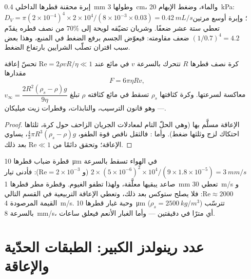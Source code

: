 \begin{example}\label{ex:b2:viscous-flows:fourth}
إبرة محقنة قطرها الداخلي \qty{0.4}{mm} وطولها \qty{3}{cm}،
والماء، وضغط الإبهام \qty{20}{kPa}: $D_V = \pi(2 \times 10^{-4})^4 \times 2 \times
10^4/(8 \times 10^{-3} \times 0.03) = \qty{0.42}{mL/s}$؛ وإبرة أوسع مرتين
تعطي ستة عشر ضعفًا. وشريان تضيّقه لويحة إلى $70\%$ من نصف
قطره يقدّم $(1/0.7)^4 = 4.2$ ضعف مقاومته: فيعوّض الجسم
برفع الضغط في المنبع، وهذا بعض سبب اقتران تصلّب الشرايين
بارتفاع الضغط.
\end{example}

\begin{proposition}\label{prop:b2:viscous-flows:stokes}
كرة نصف قطرها $R$ تتحرك بالسرعة $v$ في مائع عند
$\mathrm{Re} = 2\rho vR/\eta \ll 1$ تحسّ إعاقة مقدارها
\[
F = 6\pi\eta Rv ,
\]
معاكسة لسرعتها. وكرة كثافتها $\rho_s$ تسقط في مائع
كثافته $\rho$ تبلغ \emph{} $v_\infty =
\dfrac{2R^2(\rho_s - \rho)g}{9\eta}$ --- وهو قانون الترسيب،
والنابذات، وقطرات زيت ميليكان.
\end{proposition}

\begin{proof}
الإعاقة مسلَّم بها (وهي الحلّ التام لمعادلات الجريان الزاحف
حول كرة، ثلثاها احتكاك لزج وثلثها ضغط). وأما : فالثقل ناقص قوة الطفو، $\tfrac43\pi R^3(\rho_s -
\rho)g$، يساوي الإعاقة؛ وتحقق دائمًا من $\mathrm{Re} \ll 1$ بعد ذلك.
\end{proof}

\begin{example}\label{ex:b2:viscous-flows:fog}
قطرة ضباب قطرها \qty{10}{\micro m} في الهواء تسقط بالسرعة $2 \times (5 \times
10^{-6})^2 \times 10^4/(9 \times 1.8 \times 10^{-5}) = \qty{3}{mm/s}$ (و $\mathrm{Re} = 2 \times
10^{-3}$): فأدنى تيار صاعد يبقيها معلَّقة، ولهذا تطفو الغيوم.
وقطرة مطر قطرها \qty{1}{mm} تعطي \qty{30}{m/s} و $\mathrm{Re} \approx 2000$:
فلا يصلح ستوكس بعد ذلك، وتعطي الإعاقة التربيعية في القسم التالي
القيمة المرصودة \qty{4}{m/s}. وحبة غبار قطرها \qty{10}{\micro m} ($\rho_s =
\qty{2500}{kg/m^3}$) تترسّب بالسرعة \qty{8}{mm/s}، أي مترًا في دقيقتين ---
وأما الغبار الأنعم فيعلق ساعات.
\end{example}

\section{عدد رينولدز الكبير: الطبقات الحدّية والإعاقة}

